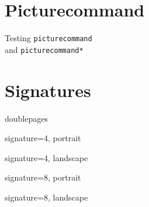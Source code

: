 \documentclass[a4paper,\myClassOptions]{article}
\begin{document}
\section{Picturecommand}
\begingroup
Testing \texttt{picturecommand}\\ and \texttt{picturecommand*}

\endgroup


\section{Signatures}
\begingroup
doublepages

signature=4, portrait

signature=4, landscape

signature=8, portrait

signature=8, landscape

\endgroup
\end{document}
